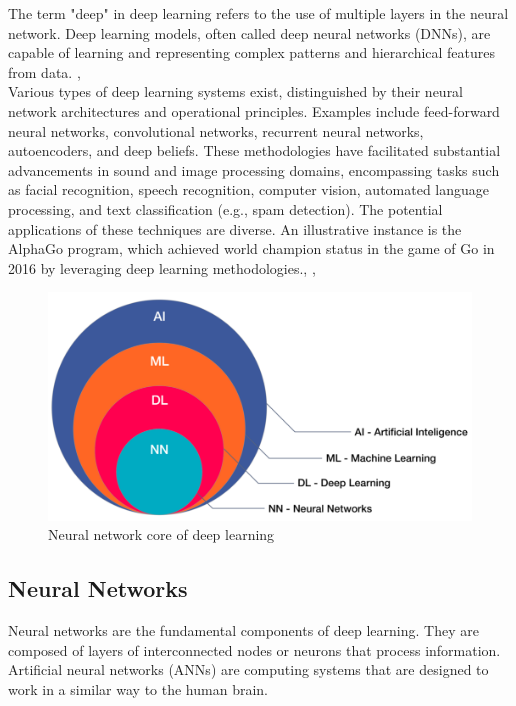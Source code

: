 The term "deep" in deep learning refers to the use of multiple layers in the neural network. Deep learning models, often called deep neural networks (DNNs), are capable of learning and representing complex patterns and hierarchical features from data. \cite{nielsen2015neural} \cite{Arnold2011AnIT}, \cite{2015Natur.521..436L} \\

Various types of deep learning systems exist, distinguished by their neural network architectures and operational principles. Examples include feed-forward neural networks, convolutional networks, recurrent neural networks, autoencoders, and deep beliefs. These methodologies have facilitated substantial advancements in sound and image processing domains, encompassing tasks such as facial recognition, speech recognition, computer vision, automated language processing, and text classification (e.g., spam detection). The potential applications of these techniques are diverse. An illustrative instance is the AlphaGo program, which achieved world champion status in the game of Go in 2016 by leveraging deep learning methodologies.\cite{koons2005}, \cite{shinde2018review}, \cite{choi2020introduction}
\begin{figure}[H]
    \centering
    \includegraphics[width=0.8\linewidth]{tex/img/NN_DL_ML.png}
    \caption{Neural network core of deep learning \cite{an}}
    \label{fig:NN_DL}
\end{figure}

\subsection{Neural Networks}
Neural networks are the fundamental components of deep learning. They are composed of layers of interconnected nodes or neurons that process information.
Artificial neural networks (ANNs) are computing systems that are designed to work in a similar way to the human brain.

